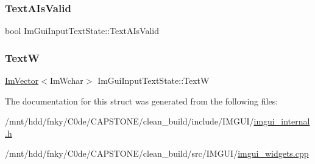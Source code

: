 \mbox{\label{structImGuiInputTextState_ac9fd681d8bb37d77b6b4ee9f58b779b5}} 
\subsubsection{\texorpdfstring{Text\+A\+Is\+Valid}{TextAIsValid}}
{\footnotesize\ttfamily bool Im\+Gui\+Input\+Text\+State\+::\+Text\+A\+Is\+Valid}

\mbox{\label{structImGuiInputTextState_ad49ccde379925fb4238dcfa308aab418}} 
\subsubsection{\texorpdfstring{TextW}{TextW}}
{\footnotesize\ttfamily \hyperlink{structImVector}{Im\+Vector}$<$Im\+Wchar$>$ Im\+Gui\+Input\+Text\+State\+::\+TextW}



The documentation for this struct was generated from the following files\+:\begin{DoxyCompactItemize}
\item 
/mnt/hdd/fnky/\+C0de/\+C\+A\+P\+S\+T\+O\+N\+E/clean\+\_\+build/include/\+I\+M\+G\+U\+I/\hyperlink{imgui__internal_8h}{imgui\+\_\+internal.\+h}\item 
/mnt/hdd/fnky/\+C0de/\+C\+A\+P\+S\+T\+O\+N\+E/clean\+\_\+build/src/\+I\+M\+G\+U\+I/\hyperlink{imgui__widgets_8cpp}{imgui\+\_\+widgets.\+cpp}\end{DoxyCompactItemize}
